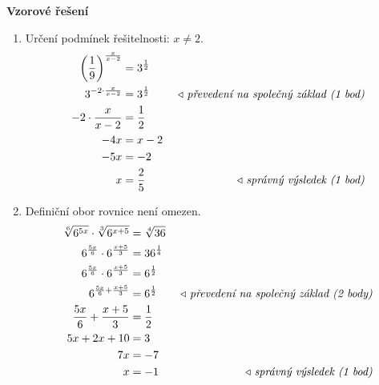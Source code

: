 \begin{center}
\Large\textbf{Vzorové řešení}\normalsize
\begin{enumerate}
    \item Určení podmínek řešitelnosti: $x\neq 2$. 
      \begin{align*}
        \begin{aligned}
          \left(\dfrac{1}{9}\right)^{\frac{x}{x-2}} &= 3^{\frac{1}{2}}\\
          3^{-2\cdot\frac{x}{x-2}} &= 3^{\frac{1}{2}} & \text{\rightnote{převedení na společný základ (1 bod)}}\\
          -2\cdot\frac{x}{x-2} &= \frac{1}{2}\\
          -4x &= x-2\\
          -5x &= -2\\
          x &= \dfrac{2}{5} & \text{\rightnote{správný výsledek (1 bod)}}
        \end{aligned}
      \end{align*}
    \item Definiční obor rovnice není omezen.
    \begin{align*}
      \begin{aligned}
        \sqrt[6]{6^{5x}} \cdot \sqrt[3]{6^{x+5}} &= \sqrt[4]{36}\\
        6^{\frac{5x}{6}} \cdot 6^{\frac{x+5}{3}} &= 36^{\frac{1}{4}}\\
        6^{\frac{5x}{6}} \cdot 6^{\frac{x+5}{3}} &= 6^{\frac{1}{2}}\\
        6^{\frac{5x}{6} + \frac{x+5}{3}} &= 6^{\frac{1}{2}}&\text{\rightnote{převedení na společný základ (2 body)}}\\
        \frac{5x}{6} + \frac{x+5}{3} &= \frac{1}{2}\\
        5x + 2x + 10 &= 3\\
        7x &= -7\\
        x &= -1&\text{\rightnote{správný výsledek (1 bod)}}
      \end{aligned}
    \end{align*}


\end{enumerate}
\end{center}
